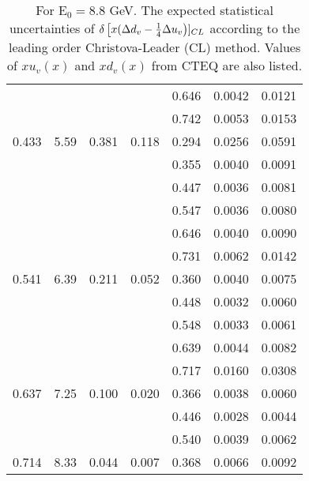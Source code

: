 \begin{table}[htbp]
\begin{center}
\begin{tabular}{|ccccc||c|c|}
         &          &          &          &    0.646 &    0.0042 &    0.0121 \\
         &          &          &          &    0.742 &    0.0053 &    0.0153 \\
   0.433 &    5.59 &   0.381 &    0.118 &    0.294 &    0.0256 &    0.0591 \\
         &          &          &          &    0.355 &    0.0040 &    0.0091 \\
         &          &          &          &    0.447 &    0.0036 &    0.0081 \\
         &          &          &          &    0.547 &    0.0036 &    0.0080 \\
         &          &          &          &    0.646 &    0.0040 &    0.0090 \\
         &          &          &          &    0.731 &    0.0062 &    0.0142 \\
   0.541 &    6.39 &   0.211 &    0.052 &    0.360 &    0.0040 &    0.0075 \\
         &          &          &          &    0.448 &    0.0032 &    0.0060 \\
         &          &          &          &    0.548 &    0.0033 &    0.0061 \\
         &          &          &          &    0.639 &    0.0044 &    0.0082 \\
         &          &          &          &    0.717 &    0.0160 &    0.0308 \\
   0.637 &    7.25 &   0.100 &    0.020 &    0.366 &    0.0038 &    0.0060 \\
         &          &          &          &    0.446 &    0.0028 &    0.0044 \\
         &          &          &          &    0.540 &    0.0039 &    0.0062 \\
   0.714 &    8.33 &   0.044 &    0.007 &    0.368 &    0.0066 &    0.0092 \\
\hline
\end{tabular}
\end{center}
\caption{\label{tab:ddv2}  For E$_0=8.8 $ GeV. 
The expected statistical uncertainties of  $\delta \left[x( \Delta d_v -{1 \over 4} \Delta u_v \right)]_{CL}$
according to the leading order Christova-Leader (CL) method. Values of $x u_v(x)$ and $x d_v(x)$ from CTEQ are also listed.
}
\end{table}
